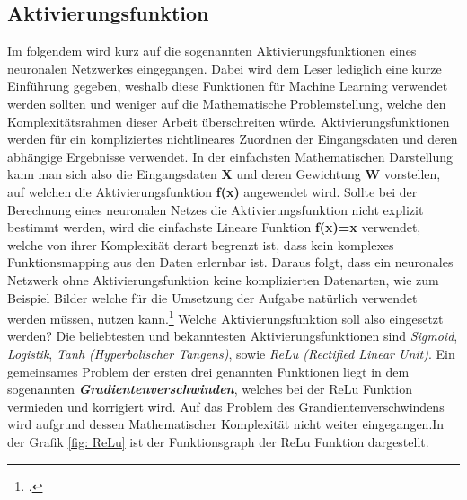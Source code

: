 \documentclass[12pt, a4paper]{scrbook}
\begin{document}
\subsection{Aktivierungsfunktion}
Im folgendem wird kurz auf die sogenannten Aktivierungsfunktionen eines neuronalen Netzwerkes eingegangen.
Dabei wird dem Leser lediglich eine kurze Einführung gegeben, weshalb diese Funktionen für Machine Learning verwendet werden sollten und weniger auf die Mathematische Problemstellung, welche den Komplexitätsrahmen dieser Arbeit überschreiten würde.
\newline
Aktivierungsfunktionen werden für ein kompliziertes nichtlineares Zuordnen der Eingangsdaten und deren abhängige Ergebnisse verwendet. In der einfachsten Mathematischen Darstellung kann man sich also die Eingangsdaten \textbf{X} und deren Gewichtung \textbf{W} vorstellen, auf welchen die Aktivierungsfunktion \textbf{f(x)} angewendet wird. Sollte bei der Berechnung eines neuronalen Netzes die Aktivierungsfunktion nicht explizit bestimmt werden, wird die einfachste Lineare Funktion \textbf{f(x)=x} verwendet, welche von ihrer Komplexität derart begrenzt ist, dass kein komplexes Funktionsmapping aus den Daten erlernbar ist. Daraus folgt, dass ein neuronales Netzwerk ohne Aktivierungsfunktion keine komplizierten Datenarten, wie zum Beispiel Bilder welche für die Umsetzung der Aufgabe natürlich verwendet werden müssen, nutzen kann.\footcite[Vgl.][]{Aktivierungsfunktion}
\newline
Welche Aktivierungsfunktion soll also eingesetzt werden? Die beliebtesten und bekanntesten Aktivierungsfunktionen sind \textit{Sigmoid}, \textit{Logistik}, \textit{Tanh (Hyperbolischer Tangens)}, sowie \textit{ReLu (Rectified Linear Unit)}.
Ein gemeinsames Problem der ersten drei genannten Funktionen liegt in dem sogenannten \textit{\textbf{Gradientenverschwinden}}, welches bei der ReLu Funktion vermieden und korrigiert wird. Auf das Problem des Grandientenverschwindens wird aufgrund dessen Mathematischer Komplexität nicht weiter eingegangen.In der Grafik \ref{fig: ReLu} ist der Funktionsgraph der ReLu Funktion dargestellt.
\end{document}
